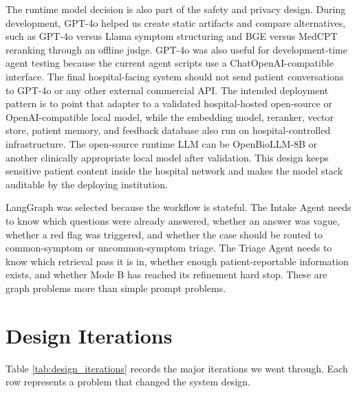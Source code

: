 The runtime model decision is also part of the safety and privacy design. During development, GPT-4o helped us create static artifacts and compare alternatives, such as GPT-4o versus Llama symptom structuring and BGE versus MedCPT reranking through an offline judge. GPT-4o was also useful for development-time agent testing because the current agent scripts use a ChatOpenAI-compatible interface. The final hospital-facing system should not send patient conversations to GPT-4o or any other external commercial API. The intended deployment pattern is to point that adapter to a validated hospital-hosted open-source or OpenAI-compatible local model, while the embedding model, reranker, vector store, patient memory, and feedback database also run on hospital-controlled infrastructure. The open-source runtime LLM can be OpenBioLLM-8B or another clinically appropriate local model after validation. This design keeps sensitive patient content inside the hospital network and makes the model stack auditable by the deploying institution.

LangGraph was selected because the workflow is stateful. The Intake Agent needs to know which questions were already answered, whether an answer was vague, whether a red flag was triggered, and whether the case should be routed to common-symptom or uncommon-symptom triage. The Triage Agent needs to know which retrieval pass it is in, whether enough patient-reportable information exists, and whether Mode B has reached its refinement hard stop. These are graph problems more than simple prompt problems.

\section{Design Iterations}

Table \ref{tab:design_iterations} records the major iterations we went through. Each row represents a problem that changed the system design.

